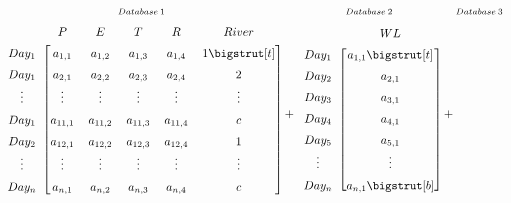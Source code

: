 \documentclass{article}
\begin{document}

\[
  \setlength{\arraycolsep}{0pt}%
  \renewcommand{\arraystretch}{1.5}%
  \begin{array}{ *{8}{c} }
    \scriptstyle Database \: 1 & & %
    \scriptstyle Database \: 2 & & %
    \scriptstyle Database \: 3 & & & %
     \\
    \begin{blockarray}{ccccccc}
    & P & E & T & R & River \\
    \begin{block}{c[cccccc]}
    Day_1 & a_{1,1}&a_{1,2}&a_{1,3}&a_{1,4}&1\bigstrut[t] \\
    Day_1 & a_{2,1}&a_{2,2}&a_{2,3}&a_{2,4}&2 \\
    \vdots & \vdots & \vdots & \vdots & \vdots & \vdots\\
    Day_1 & a_{11,1}&a_{11,2}&a_{11,3}&a_{11,4}&c \\
    Day_2 & a_{12,1}&a_{12,2}&a_{12,3}&a_{12,4}&1 \\
    \vdots & \vdots & \vdots & \vdots & \vdots & \vdots\\
    Day_n & a_{n,1}&a_{n,2}&a_{n,3}&a_{n,4}&c \\
    \end{block}
    \end{blockarray}\vspace*{-1.25\baselineskip}
    & {} + {} &
    \begin{blockarray}{cccccc}
    & WL \\
    \begin{block}{c[ccccc]}
    Day_1 & a_{1,1}\bigstrut[t] \\
    Day_2 & a_{2,1} \\
    Day_3 & a_{3,1} \\
    Day_4 & a_{4,1} \\
    Day_5 & a_{5,1} \\
    \vdots & \vdots \\
    Day_n & a_{n,1}\bigstrut[b]\\
    \end{block}
    \end{blockarray}\vspace*{-1.25\baselineskip}
    & {} + {} &
    \begin{blockarray}{cccccc}

\end{blockarray}
\end{array}\]
\end{document}

